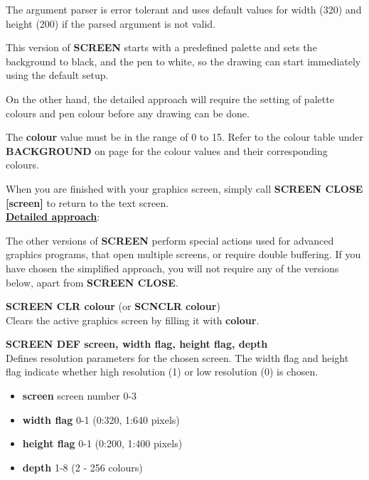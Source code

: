 \begin{description}[leftmargin=2cm,style=nextline]
               The argument parser is error tolerant and uses default values
               for width (320) and height (200)
               if the parsed argument is not valid.

               This version of {\bf SCREEN} starts with a predefined
               palette and sets the background to black, and the pen to white,
               so the drawing can start immediately using the default setup.

               On the other hand, the detailed approach
               will require the setting of palette colours and pen colour
               before any drawing can be done.

               The {\bf colour} value must be in the range of 0 to 15.
               Refer to the colour table under {\bf BACKGROUND} on page
               \pageref{colourtable} for the colour values and their corresponding colours.

               When you are finished with your graphics screen, simply call
               {\bf SCREEN CLOSE [screen]} to return to the text screen.\\
        \underline{{\bf Detailed approach}}:

               The other versions of
               {\bf SCREEN} perform special actions used for
               advanced graphics programs, that open multiple screens,
               or require double buffering. If you have chosen the simplified
               approach, you will not require any of the versions below,
               apart from {\bf SCREEN CLOSE}.

                {\bf SCREEN CLR colour} (or {\bf SCNCLR colour}) \\
                Clears the active graphics screen by filling it with {\bf colour}.

                {\bf SCREEN DEF screen, width flag, height flag, depth} \\
                Defines resolution parameters for the chosen
                screen. The width flag and height flag indicate
                whether high resolution (1) or low resolution (0) is chosen.

                \begin{itemize}
                  \item {\bf screen} screen number 0-3
                  \item {\bf width flag} 0-1 (0:320, 1:640 pixels)
                  \item {\bf height flag} 0-1 (0:200, 1:400 pixels)
                  \item {\bf depth} 1-8 (2 - 256 colours)
                \end{itemize}


\end{description}
